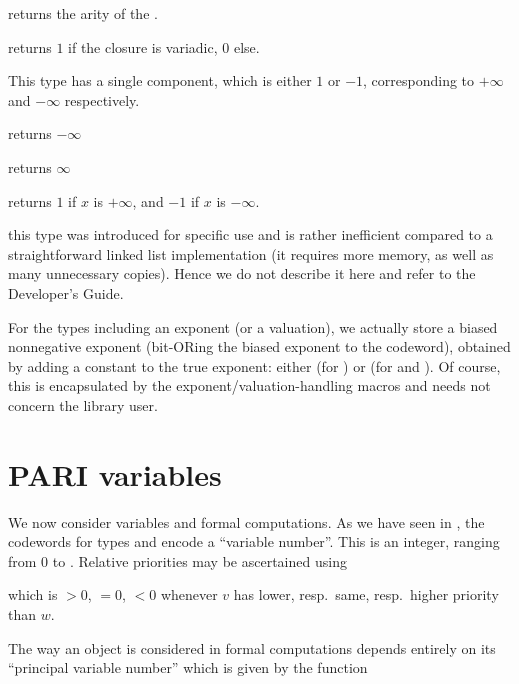  returns the arity of the .

 returns $1$ if the closure  is
variadic, $0$ else.


This type has a single  component, which is either $1$ or $-1$,
corresponding to $+\infty$ and $-\infty$ respectively.

 returns $-\infty$

 returns $\infty$

 returns $1$ if $x$ is $+\infty$, and $-1$
if $x$ is $-\infty$.

this type was introduced for specific  use and is rather inefficient
compared to a straightforward linked list implementation (it requires more
memory, as well as many unnecessary copies). Hence we do not describe it
here and refer to the Developer's Guide.

 For the types including an exponent (or a
valuation), we actually store a biased nonnegative exponent (bit-ORing the
biased exponent to the codeword), obtained by adding a constant to the true
exponent: either  (for ) or  (for
 and ). Of course, this is encapsulated by the
exponent/valuation-handling macros and needs not concern the library user.

\section{PARI variables}\label{se:vars}

\noindent We now consider variables and formal computations. As we have seen
in , the codewords for types  and  encode a
``variable number''. This is an integer, ranging from $0$ to .
Relative priorities may be ascertained using


\noindent which is $>0$, $=0$, $<0$ whenever $v$ has lower, resp.~same,
resp.~higher priority than $w$.

The way an object is considered in formal computations depends entirely on
its ``principal variable number'' which is given by the function

